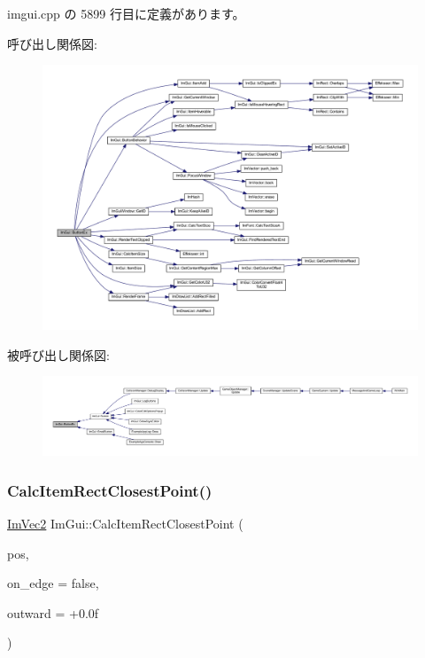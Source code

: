  imgui.\+cpp の 5899 行目に定義があります。

呼び出し関係図\+:\nopagebreak
\begin{figure}[H]
\begin{center}
\leavevmode
\includegraphics[width=350pt]{namespace_im_gui_ae479220c66b039874c6e4c9e9b22849f_cgraph}
\end{center}
\end{figure}
被呼び出し関係図\+:
\nopagebreak
\begin{figure}[H]
\begin{center}
\leavevmode
\includegraphics[width=350pt]{namespace_im_gui_ae479220c66b039874c6e4c9e9b22849f_icgraph}
\end{center}
\end{figure}
\mbox{\label{namespace_im_gui_a6c66a7acf7e6eef639b5f1211d8332a3}} 
\subsubsection{\texorpdfstring{Calc\+Item\+Rect\+Closest\+Point()}{CalcItemRectClosestPoint()}}
{\footnotesize\ttfamily \mbox{\hyperlink{struct_im_vec2}{Im\+Vec2}} Im\+Gui\+::\+Calc\+Item\+Rect\+Closest\+Point (\begin{DoxyParamCaption}\item[{const \mbox{\hyperlink{struct_im_vec2}{Im\+Vec2}} \&}]{pos,  }\item[{bool}]{on\+\_\+edge = {\ttfamily false},  }\item[{float}]{outward = {\ttfamily +0.0f} }\end{DoxyParamCaption})}



